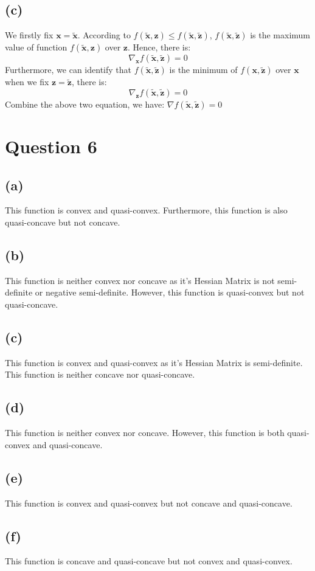 \documentclass[10pt,a4paper]{article}
\begin{document}
\subsection*{(c)}
We firstly fix $\mathbf{x} = \tilde{\mathbf{x}}$. According to $f(\tilde{\mathbf{x}}, \mathbf{z}) \leq f(\tilde{\mathbf{x}}, \tilde{\mathbf{z}})$, $f(\tilde{\mathbf{x}}, \tilde{\mathbf{z}})$ is the maximum value of function $f(\tilde{\mathbf{x}}, \mathbf{z})$ over $\mathbf{z}$. Hence, there is:
\begin{equation*}
	\nabla_{\mathbf{x}} f(\tilde{\mathbf{x}}, \tilde{\mathbf{z}}) = 0
\end{equation*}
Furthermore, we can identify that $f(\tilde{\mathbf{x}}, \tilde{\mathbf{z}})$ is the minimum of $f(\mathbf{x}, \tilde{\mathbf{z}})$ over $\mathbf{x}$ when we fix $\mathbf{z} = \tilde{\mathbf{z}}$, there is:
\begin{equation*}
	\nabla_{\mathbf{z}} f(\tilde{\mathbf{x}}, \tilde{\mathbf{z}}) = 0
\end{equation*}
Combine the above two equation, we have: $\nabla f(\tilde{\mathbf{x}}, \tilde{\mathbf{z}}) = 0$

\section*{Question 6}
\subsection*{(a)}
This function is convex and quasi-convex. Furthermore, this function is also quasi-concave but not concave.
\subsection*{(b)}
This function is neither convex nor concave as it's Hessian Matrix is not semi-definite or negative semi-definite. However, this function is quasi-convex but not quasi-concave.
\subsection*{(c)}
This function is convex and quasi-convex as it's Hessian Matrix is semi-definite. This function is neither concave nor quasi-concave.
\subsection*{(d)}
This function is neither convex nor concave. However, this function is both quasi-convex and quasi-concave.
\subsection*{(e)}
This function is convex and quasi-convex but not concave and quasi-concave.
\subsection*{(f)}
This function is concave and quasi-concave but not convex and quasi-convex.
\end{document}
